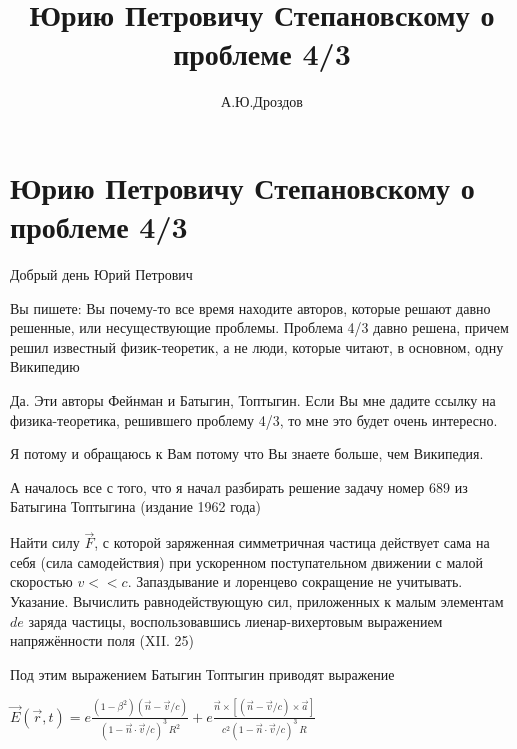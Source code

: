 \documentclass{article}
\begin{document}
\title{Юрию Петровичу Степановскому о проблеме 4/3}

\author{А.Ю.Дроздов}



\begin{titlepage}
\maketitle
\end{titlepage}


\section{Юрию Петровичу Степановскому о проблеме 4/3}

Добрый день Юрий Петрович

Вы пишете: Вы почему-то все время находите авторов, которые решают давно решенные, или несуществующие проблемы. Проблема 4/3 давно решена, причем решил известный физик-теоретик, а не люди, которые читают, в основном, одну Википедию



Да. Эти авторы Фейнман и Батыгин, Топтыгин. Если Вы мне дадите ссылку на физика-теоретика, решившего проблему 4/3, то мне это будет очень интересно.

Я потому и обращаюсь к Вам потому что Вы знаете больше, чем Википедия.

А началось все с того, что я начал разбирать решение задачу номер 689 из Батыгина Топтыгина (издание 1962 года)


Найти силу $\vec{F}$, с которой заряженная симметричная частица действует сама на себя (сила самодействия) при ускоренном поступательном движении с малой скоростью $v << c$. Запаздывание и лоренцево сокращение не учитывать.
Указание. Вычислить равнодействующую сил, приложенных к малым элементам $de$ заряда частицы, воспользовавшись лиенар-вихертовым выражением напряжённости поля (XII. 25)  

Под этим выражением Батыгин Топтыгин приводят выражение

$\vec{E}\left(\vec{r},t\right) = e \frac{\left(1-\beta^2\right) \left(\vec{n}-\vec{v}/c \right)}{\left(1-\vec{n}\cdot\vec{v}/c\right)^3\,R^2} + e \frac{ \vec{n} \times \left[ \left( \vec{n}-\vec{v}/c\right) \times \vec{a}\right]}{c^2 \left(1-\vec{n} \cdot \vec{v}/c \right)^3 \,R }$
\end{document}
